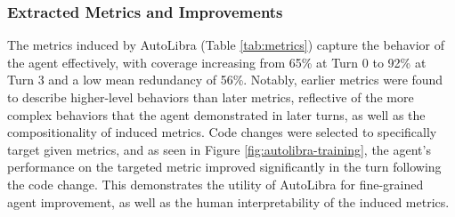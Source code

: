 \subsubsection{Extracted Metrics and Improvements}
The metrics induced by AutoLibra (Table \ref{tab:metrics}) capture the behavior of the agent effectively, with coverage increasing from 65\% at Turn 0 to 92\% at Turn 3 and a low mean redundancy of 56\%. Notably, earlier metrics were found to describe higher-level behaviors than later metrics, reflective of the more complex behaviors that the agent demonstrated in later turns, as well as the compositionality of induced metrics. Code changes were selected to specifically target given metrics, and as seen in Figure \ref{fig:autolibra-training}, the agent's performance on the targeted metric improved significantly in the turn following the code change. This demonstrates the utility of AutoLibra for fine-grained agent improvement, as well as the human interpretability of the induced metrics.

